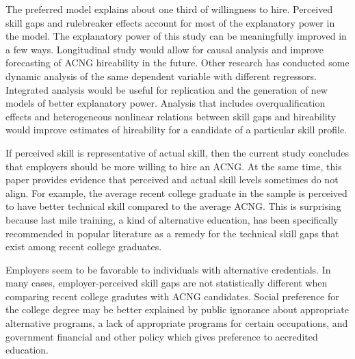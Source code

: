 \documentclass[review]{elsarticle}
\begin{document}
The preferred model explains about one third of willingness to hire.
Perceived skill gaps and rulebreaker effects account for most of the explanatory power in the model.
The explanatory power of this study can be meaningfully improved in a few ways.
Longitudinal study would allow for causal analysis and improve forecasting of ACNG hireability in the future.
Other research has conducted some dynamic analysis of the same dependent variable with different regressors\cite{vandivier2020preliminary}.
Integrated analysis would be useful for replication and the generation of new models of better explanatory power.
Analysis that includes overqualification effects and heterogeneous nonlinear relations between skill gaps and hireability would improve estimates of hireability for a candidate of a particular skill profile.

If perceived skill is representative of actual skill,
then the current study concludes that employers should be more willing to hire an ACNG.
At the same time, this paper provides evidence that perceived and actual skill levels sometimes do not align.
For example, the average recent college graduate in the sample is perceived to have better technical skill compared to the average ACNG.
This is surprising because last mile training, a kind of alternative education, has been specifically recommended in popular literature as a remedy for the technical skill gaps that exist among recent college graduates.

Employers seem to be favorable to individuals with alternative credentials.
In many cases, employer-perceived skill gaps are not statistically different when comparing recent college gradutes with ACNG candidates.
Social preference for the college degree may be better explained by public ignorance about appropriate alternative programs,
a lack of appropriate programs for certain occupations,
and government financial and other policy which gives preference to accredited education.
\end{document}
